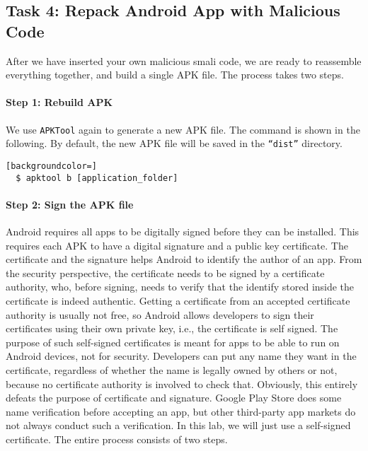 \subsection{Task 4: Repack Android App with Malicious Code}

After we have inserted your own malicious smali code, we are ready to reassemble everything
together, and build a single APK file. The process takes two steps.
	

\paragraph{Step 1: Rebuild APK}
We use \texttt{APKTool} again to generate a new APK file. The command is shown in the following. 
By default, the new APK file will be saved in the \texttt{“dist”}
directory.

\begin{lstlisting}[backgroundcolor=]
  $ apktool b [application_folder] 
\end{lstlisting}
 

\paragraph{Step 2: Sign the APK file}
Android requires all apps to be digitally signed before they can be installed. 
This requires each APK to have a digital signature and a public key certificate. 
The certificate and the signature helps Android to identify the 
author of an app. From the security perspective, the certificate needs to be signed by a
certificate authority, who, before signing, needs to verify that the identify stored inside the certificate is
indeed authentic. Getting a certificate from an accepted certificate authority
is usually not free, so Android allows developers
to sign their certificates using their own private key, i.e., the certificate is self signed. 
The purpose of such self-signed certificates is meant for apps to be able to run
on Android devices, not for security. Developers can put any name they want
in the certificate, regardless of whether the
name is legally owned by others or not, because no certificate authority is involved to check
that. Obviously, this entirely defeats the purpose of certificate and signature. 
Google Play Store does some name verification before accepting an app, 
but other third-party app markets do not always conduct such a
verification. In this lab, we will just use a self-signed certificate. The
entire process consists of two steps. 


